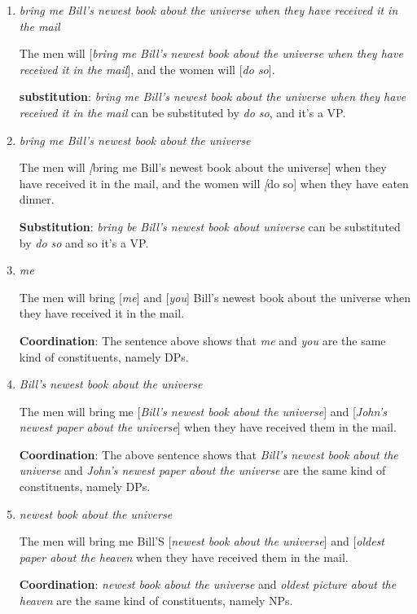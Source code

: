 \documentclass[a4paper,12pt]{article}
\begin{document}
\begin{enumerate}
\begin{enumerate}
      \item \textit{bring me Bill's newest book about the universe when they have received it in the mail}

         The men will [\textit {bring me Bill's newest book about the universe when they have received it in the mail}], and the women will [\textit {do so}].

         \textbf {substitution}: \textit {bring me Bill's newest book about the universe when they have received it in the mail} can be substituted by \textit {do so}, and it's a VP.

      \item \textit {bring me Bill's newest book about the universe}

         The men will \textit [{bring me Bill's newest book about the universe}] when they have received it in the mail, and the women will \textit [{do so}] when they have eaten dinner.

         \textbf {Substitution}: \textit{bring be Bill's newest book about universe} can be substituted by \textit {do so} and so it's a VP.

      \item \textit {me}

         The men will bring [\textit {me}] and [\textit {you}] Bill's newest book about the universe when they have received it in the mail.

         \textbf {Coordination}: The sentence above shows that \textit {me} and \textit {you} are the same kind of constituents, namely DPs.

      \item \textit {Bill's newest book about the universe}

         The men will bring me [\textit {Bill's newest book about the universe}] and [\textit{John's newest paper about the universe}] when they have received them in the mail.

         \textbf {Coordination}: The above sentence shows that \textit {Bill's newest book about the universe} and \textit{John's newest paper about the universe} are the same kind of constituents, namely DPs.

      \item \textit{newest book about the universe}

         The men will bring me Bill'S [\textit {newest book about the universe}] and [\textit {oldest paper about the heaven} when they have received them in the mail.

         \textbf {Coordination}: \textit {newest book about the universe} and \textit{oldest picture about the heaven} are the same kind of constituents, namely NPs.


\end{enumerate}
\end{enumerate}
\end{document}
